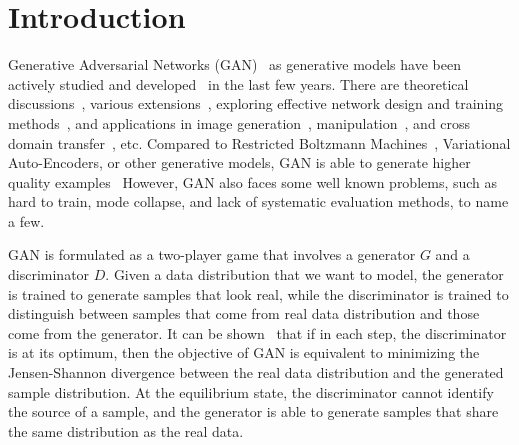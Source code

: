 \section{Introduction} \label{sec:intro}

Generative Adversarial Networks (GAN)~\cite{goodfellow2014generative}
as generative models have been actively studied
and developed~\cite{chen2016infogan,nowozin2016f,
arjovsky2017wasserstein,zhao2016energy,
mescheder2017adversarial,mirza2014conditional,
odena2016conditional,denton2015deep,
huang2016stacked,zhang2016stackgan,kim2017learning,zhu2017unpaired,
che2016mode,donahue2016adversarial,salimans2016improved,zhu2016generative}
in the last few years.
There are theoretical discussions~\cite{arjovsky2017wasserstein,
zhao2016energy,nowozin2016f},
various extensions~\cite{chen2016infogan,che2016mode,donahue2016adversarial,
salimans2016improved,mescheder2017adversarial,mirza2014conditional,
huang2016stacked},
exploring effective network design and
training methods~\cite{arjovsky2017towards},
and applications in image generation~\cite{odena2016conditional,denton2015deep,
zhang2016stackgan},
manipulation~\cite{zhu2016generative,perarnau2016invertible},
and cross domain transfer~\cite{kim2017learning,zhu2017unpaired},
etc.
Compared to Restricted Boltzmann Machines~\cite{hinton2002training},
Variational Auto-Encoders,
or other generative models,
GAN is able to generate higher quality examples~\cite{ledig2016photo}
However,
GAN also faces some well known problems,
such as hard to train,
mode collapse,
and lack of systematic evaluation methods,
to name a few.

GAN is formulated as a two-player game that involves a generator $G$ and
a discriminator $D$.
Given a data distribution that we want to model,
the generator is trained to generate samples that look real,
while the discriminator is trained to distinguish between
samples that come from real data distribution and
those come from the generator.
It can be shown~\cite{goodfellow2014generative} that if in each step,
the discriminator is at its optimum,
then the objective of GAN
is equivalent to minimizing the Jensen-Shannon divergence between
the real data distribution and the generated sample distribution.
At the equilibrium state,
the discriminator cannot identify the source of a sample,
and the generator is able to generate samples that share the same
distribution as the real data.

